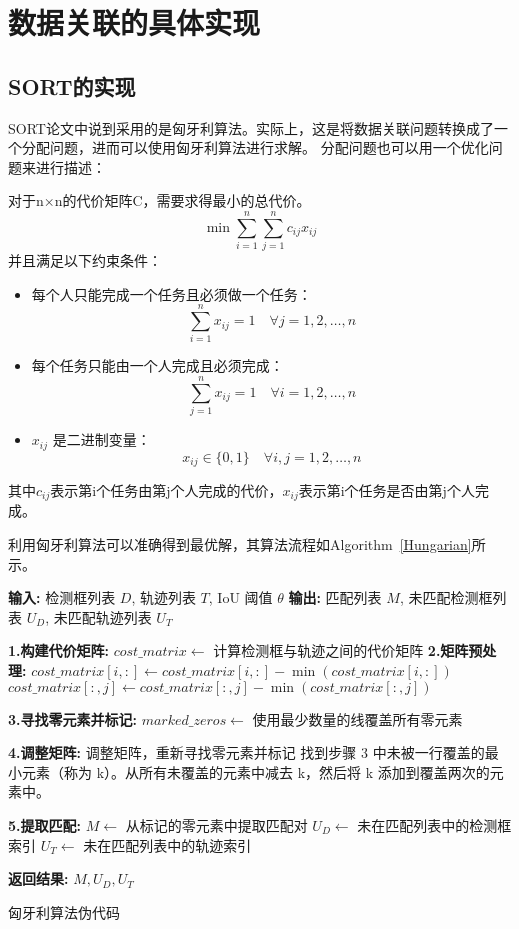 \chapter{数据关联的具体实现}
\section{SORT的实现}
SORT论文中说到采用的是匈牙利算法。实际上，这是将数据关联问题转换成了一个分配问题，进而可以使用匈牙利算法进行求解。
分配问题也可以用一个优化问题来进行描述：
\begin{tcolorbox}
	对于n×n的代价矩阵C，需要求得最小的总代价。
	\[
	\min \sum_{i=1}^n \sum_{j=1}^n c_{ij} x_{ij}
	\]
	并且满足以下约束条件：
	\begin{itemize}
		\item 每个人只能完成一个任务且必须做一个任务：
		\[
		\sum_{i=1}^n x_{ij} = 1 \quad \forall j = 1, 2, \ldots, n
		\]
		\item 每个任务只能由一个人完成且必须完成：
		\[
		\sum_{j=1}^n x_{ij} = 1 \quad \forall i = 1, 2, \ldots, n
		\]
		\item \( x_{ij} \) 是二进制变量：
		\[
		x_{ij} \in \{0, 1\} \quad \forall i, j = 1, 2, \ldots, n
		\]
	\end{itemize}
	其中$c_{ij}$表示第i个任务由第j个人完成的代价，$x_{ij}$表示第i个任务是否由第j个人完成。
\end{tcolorbox}

利用匈牙利算法可以准确得到最优解，其算法流程如Algorithm\ \ref{Hungarian}所示。

\begin{algorithm}[h!]
	\begin{algorithmic}
		\State \textbf{输入:} 检测框列表 $D$, 轨迹列表 $T$, IoU 阈值 $\theta$
		\State \textbf{输出:} 匹配列表 $M$, 未匹配检测框列表 $U_D$, 未匹配轨迹列表 $U_T$
		
		\State \textbf{1.构建代价矩阵:}
		\State $cost\_matrix \leftarrow$ 计算检测框与轨迹之间的代价矩阵
		\State \textbf{2.矩阵预处理:}
		\State $cost\_matrix[i, :] \leftarrow cost\_matrix[i, :] - \min(cost\_matrix[i, :])$
		\EndFor
		\State $cost\_matrix[:, j] \leftarrow cost\_matrix[:, j] - \min(cost\_matrix[:, j])$
		\EndFor
		
		\State \textbf{3.寻找零元素并标记:}
		\State $marked\_zeros \leftarrow$ 使用最少数量的线覆盖所有零元素
		
		\State \textbf{4.调整矩阵:}
		\State 调整矩阵，重新寻找零元素并标记
		\State 找到步骤 3 中未被一行覆盖的最小元素（称为 k）。从所有未覆盖的元素中减去 k，然后将 k 添加到覆盖两次的元素中。
		\EndWhile
		
		\State \textbf{5.提取匹配:}
		\State $M \leftarrow$ 从标记的零元素中提取匹配对
		\State $U_D \leftarrow$ 未在匹配列表中的检测框索引
		\State $U_T \leftarrow$ 未在匹配列表中的轨迹索引
		
		\State \textbf{返回结果:}
		\Return $M, U_D, U_T$
	\end{algorithmic}
	\caption{匈牙利算法伪代码}
	\label{Hungarian}
\end{algorithm}

